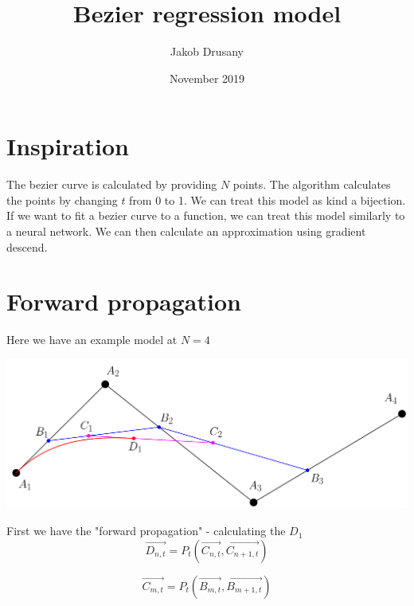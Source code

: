 \documentclass{article}
\title{Bezier regression model}
\author{Jakob Drusany}
\date{November 2019}
\begin{document}
\maketitle

\section{Inspiration}
The bezier curve is calculated by providing $N$ points. The algorithm calculates the points by changing $t$ from 0 to 1. We can treat this model as kind a bijection. If we want to fit a bezier curve to a function, we can treat this model similarly to a neural network. We can then calculate an approximation using gradient descend.

\section{Forward propagation}
Here we have an example model at $N = 4$

\includegraphics[width=\textwidth]{bezier}

First we have the "forward propagation" - calculating the $D_1$
\begin{equation} \label{eq:1}
    \vec{D_{n, t}} = P_t(\vec{C_{n, t}}, \vec{C_{n+1, t}})  
\end{equation}

\begin{equation} \label{eq:2}
    \vec{C_{m, t}} = P_t(\vec{B_{m, t}}, \vec{B_{m+1, t}})  
\end{equation}
\end{document}
